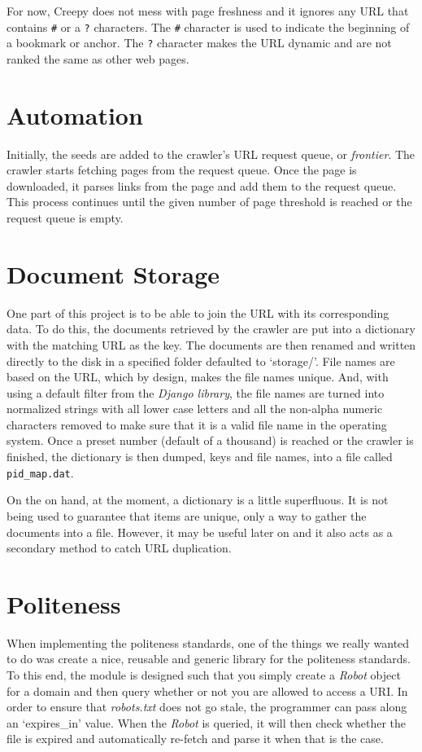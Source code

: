 \documentclass[letterpaper,11pt,twoside]{article}
\begin{document}
For now, Creepy does not mess with page freshness and it ignores any URL that contains \texttt{\#} or a \texttt{?} characters. The \texttt{\#} character is used to indicate the beginning of a bookmark or anchor. The \texttt{?} character makes the URL dynamic and are not ranked the same as other web pages.

\section{Automation}
Initially, the seeds are added to the crawler's URL request queue, or \emph{frontier}. The crawler starts fetching pages from the request queue. Once the page is downloaded, it parses links from the page and add them to the request queue. This process continues until the given number of page threshold is reached or the request queue is empty.

\section{Document Storage}
One part of this project is to be able to join the URL with its corresponding data. To do this, the documents retrieved by the crawler are put into a dictionary with the matching URL as the key. The documents are then renamed and written directly to the disk in a specified folder defaulted to `storage/'. File names are based on the URL, which by design, makes the file names unique. And, with using a default filter from the \emph{Django library}, the file names are turned into normalized strings with all lower case letters and all the non-alpha numeric characters removed to make sure that it is a valid file name in the operating system. Once a preset number (default of a thousand) is reached or the crawler is finished, the dictionary is then dumped, keys and file names, into a file called \texttt{pid\_map.dat}.

On the on hand, at the moment, a dictionary is a little superfluous. It is not being used to guarantee that items are unique, only a way to gather the documents into a file. However, it may be useful later on and it also acts as a secondary method to catch URL duplication.

\section{Politeness}
When implementing the politeness standards, one of the things we really wanted to do was create a nice, reusable and generic library for the politeness standards. To this end, the module is designed such that you simply create a \emph{Robot} object for a domain and then query whether or not you are allowed to access a URI. In order to ensure that \emph{robots.txt} does not go stale, the programmer can pass along an `expires\_in' value. When the \emph{Robot} is queried, it will then check whether the file is expired and automatically re-fetch and parse it when that is the case.
\end{document}
